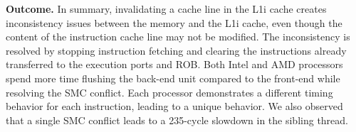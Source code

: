 \noindent\textbf{Outcome.} In summary, invalidating a cache line in the L1i cache creates inconsistency issues between the memory and the L1i cache, even though the content of the instruction cache line may not be modified. The inconsistency is resolved by stopping instruction fetching and clearing the instructions already transferred to the execution ports and ROB. Both Intel and AMD processors spend more time flushing the back-end unit compared to the front-end while resolving the SMC conflict. Each processor demonstrates a different timing behavior for each instruction, leading to a unique behavior. We also observed that a single SMC conflict leads to a 235-cycle slowdown in the sibling thread.